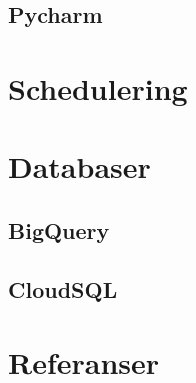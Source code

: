 \documentclass[
  letterpaper,
  DIV=11,
  numbers=noendperiod]{scrreprt}
\newlength{\cslhangindent}
\newlength{\cslentryspacingunit} %
\newenvironment{CSLReferences}[2] %
 {%
  \setlength{\parindent}{0pt}
  \ifodd #1
  \let\oldpar\par
  \def\par{\hangindent=\cslhangindent\oldpar}
  \fi
  \setlength{\parskip}{#2\cslentryspacingunit}
 }%
 {}
\begin{document}
\hypertarget{pycharm}{%
\section{Pycharm}\label{pycharm}}

\hypertarget{schedulering}{%
\chapter{Schedulering}\label{schedulering}}

\hypertarget{databaser}{%
\chapter{Databaser}\label{databaser}}

\hypertarget{bigquery}{%
\section{BigQuery}\label{bigquery}}

\hypertarget{cloudsql}{%
\section{CloudSQL}\label{cloudsql}}


\hypertarget{referanser}{%
\chapter*{Referanser}\label{referanser}}

\hypertarget{refs}{}
\begin{CSLReferences}{0}{0}
\end{CSLReferences}
\end{document}
